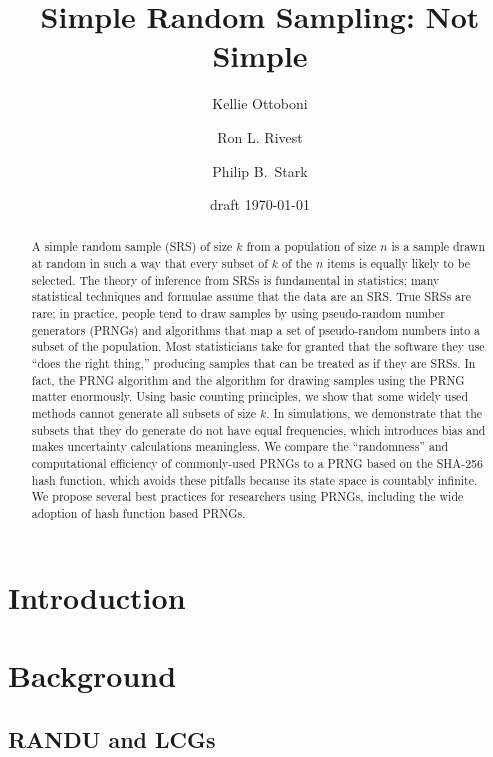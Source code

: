 \documentclass[12pt]{article}
\begin{document}
\title{Simple Random Sampling: Not Simple}
\author{Kellie Ottoboni
\and
Ron L. Rivest
\and
Philip B.~Stark 
}

\date{draft \today}




\maketitle

\begin{abstract}
\small
A simple random sample (SRS) of size $k$ from a population of size $n$ is a sample drawn 
at random in such a way that every subset of $k$ of the $n$ items is equally likely to be selected. 
The theory of inference from SRSs is fundamental in statistics;
many statistical techniques and formulae assume that the data are an SRS.
True SRSs are rare; in practice, people tend to draw samples by using pseudo-random number generators 
(PRNGs) and algorithms that map a set of pseudo-random numbers into a subset of the population. 
Most statisticians take for granted that the software they use ``does the right thing,''
producing samples that can be treated as if they are SRSs.
In fact, the PRNG algorithm and the algorithm for drawing samples using the PRNG matter
enormously.
Using basic counting principles, we show that some widely used methods cannot generate all subsets of size $k$.
In simulations, we demonstrate that the subsets that they do generate do not have equal frequencies, which
introduces bias and makes uncertainty calculations meaningless.
We compare the ``randomness'' and computational efficiency of commonly-used PRNGs to a PRNG 
based on the SHA-256 hash function, which avoids these pitfalls because its state space is countably infinite.
We propose several best practices for researchers using PRNGs, including the wide adoption of hash function based PRNGs.
\end{abstract}

\section{Introduction}

\section{Background}
\subsection{RANDU and LCGs}
\end{document}
